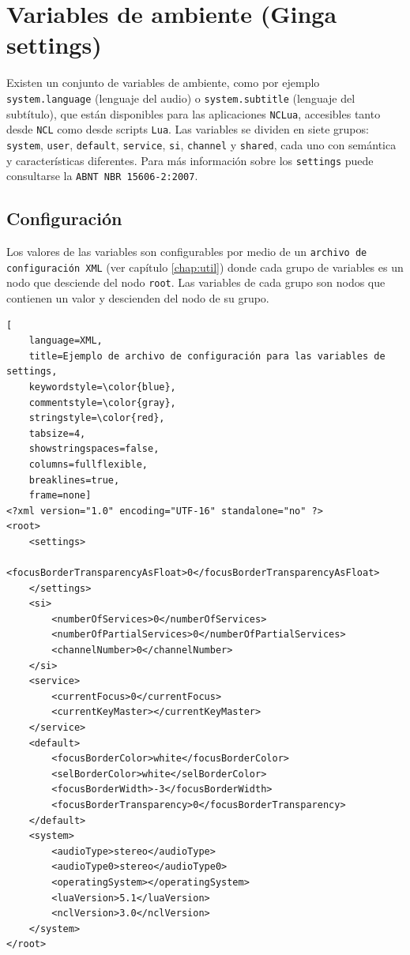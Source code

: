 \section{Variables de ambiente (Ginga settings)}
Existen un conjunto de variables de ambiente, como por ejemplo \texttt{system.language} (lenguaje del audio) o \texttt{system.subtitle} (lenguaje del subtítulo), que están disponibles para las aplicaciones \texttt{NCLua}, accesibles tanto desde \texttt{NCL} como desde scripts \texttt{Lua}. Las variables se dividen en siete grupos: \texttt{system}, \texttt{user}, \texttt{default}, \texttt{service}, \texttt{si}, \texttt{channel} y \texttt{shared}, cada uno con semántica y características diferentes. Para más información sobre los \texttt{settings} puede consultarse la \texttt{ABNT NBR 15606-2:2007}.

\subsection{Configuración}
Los valores de las variables son configurables por medio de un \texttt{archivo de configuración XML} (ver capítulo \ref{chap:util}) donde cada grupo de variables es un nodo que desciende del nodo \texttt{root}. Las variables de cada grupo son nodos que contienen un valor y descienden del nodo de su grupo.

\begin{lstlisting}[
	language=XML,
	title=Ejemplo de archivo de configuración para las variables de settings,
	keywordstyle=\color{blue},
	commentstyle=\color{gray},
	stringstyle=\color{red},
	tabsize=4,
	showstringspaces=false,
	columns=fullflexible,
	breaklines=true,
	frame=none]
<?xml version="1.0" encoding="UTF-16" standalone="no" ?>
<root>
	<settings>
		<focusBorderTransparencyAsFloat>0</focusBorderTransparencyAsFloat>
	</settings>
	<si>
		<numberOfServices>0</numberOfServices>
		<numberOfPartialServices>0</numberOfPartialServices>
		<channelNumber>0</channelNumber>
	</si>
	<service>
		<currentFocus>0</currentFocus>
		<currentKeyMaster></currentKeyMaster>
	</service>
	<default>
		<focusBorderColor>white</focusBorderColor>
		<selBorderColor>white</selBorderColor>
		<focusBorderWidth>-3</focusBorderWidth>
		<focusBorderTransparency>0</focusBorderTransparency>
	</default>
	<system>
		<audioType>stereo</audioType>
		<audioType0>stereo</audioType0>
		<operatingSystem></operatingSystem>
		<luaVersion>5.1</luaVersion>
		<nclVersion>3.0</nclVersion>
	</system>
</root>
\end{lstlisting}


